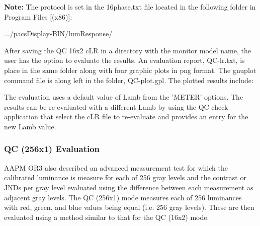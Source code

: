 \textbf{Note:} The protocol is set in the 16phase.txt file located in the following folder in Program Files [(x86)]:
\begin{center}
	\textnormal{.../pacsDisplay-BIN/lumResponse/}
\end{center}


After saving the QC 16x2 cLR in a directory with the monitor model name, the user has the option to evaluate the results. An evaluation report, \textnormal{QC-lr.txt}, is place in the same folder along with four graphic plots in png format. The gnuplot command file is along left in the folder, \textnormal{QC-plot.gpl}. The plotted results include: 


The evaluation uses a default value of Lamb from the 'METER' options. The results can be re-evaluated with a different Lamb by using the QC check application that select the cLR file to re-evaluate and provides an entry for the new Lamb value.

\subsubsection{QC (256x1) Evaluation}

AAPM OR3 also described an advanced measurement test for which the calibrated luminance is measure for each of 256 gray levels and the contrast or JNDs per gray level evaluated using the difference between each measurement as adjacent gray levels. The QC (256x1) mode measures each of 256 luminances with red, green, and blue values being equal (i.e. 256 gray levels). These are then evaluated using a method similar to that for the QC (16x2) mode.


%